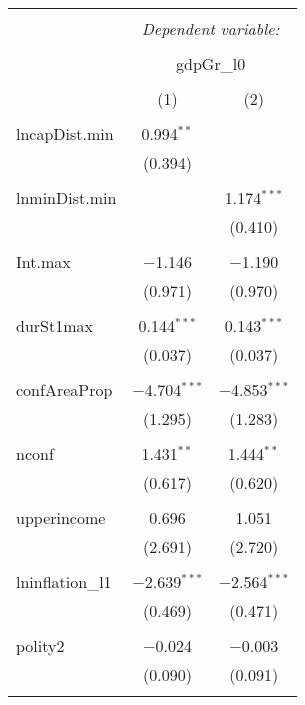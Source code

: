 \begin{table}[!htbp] \centering 
  \caption{} 
  \label{} 
\begin{tabular}{@{\extracolsep{5pt}}lcc} 
\\[-1.8ex]\hline 
\hline \\[-1.8ex] 
 & \multicolumn{2}{c}{\textit{Dependent variable:}} \\ 
\cline{2-3} 
\\[-1.8ex] & \multicolumn{2}{c}{gdpGr\_l0} \\ 
\\[-1.8ex] & (1) & (2)\\ 
\hline \\[-1.8ex] 
 lncapDist.min & 0.994$^{**}$ &  \\ 
  & (0.394) &  \\ 
  & & \\ 
 lnminDist.min &  & 1.174$^{***}$ \\ 
  &  & (0.410) \\ 
  & & \\ 
 Int.max & $-$1.146 & $-$1.190 \\ 
  & (0.971) & (0.970) \\ 
  & & \\ 
 durSt1max & 0.144$^{***}$ & 0.143$^{***}$ \\ 
  & (0.037) & (0.037) \\ 
  & & \\ 
 confAreaProp & $-$4.704$^{***}$ & $-$4.853$^{***}$ \\ 
  & (1.295) & (1.283) \\ 
  & & \\ 
 nconf & 1.431$^{**}$ & 1.444$^{**}$ \\ 
  & (0.617) & (0.620) \\ 
  & & \\ 
 upperincome & 0.696 & 1.051 \\ 
  & (2.691) & (2.720) \\ 
  & & \\ 
 lninflation\_l1 & $-$2.639$^{***}$ & $-$2.564$^{***}$ \\ 
  & (0.469) & (0.471) \\ 
  & & \\ 
 polity2 & $-$0.024 & $-$0.003 \\ 
  & (0.090) & (0.091) \\ 
  & & \\ 

\end{tabular}
\end{table}

